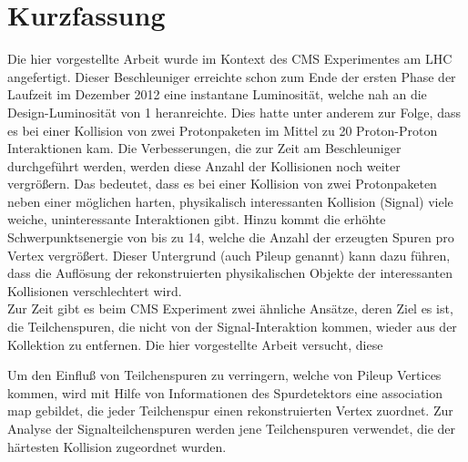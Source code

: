 
\chapter*{Kurzfassung}

Die hier vorgestellte Arbeit wurde im Kontext des CMS Experimentes am LHC angefertigt. Dieser Beschleuniger erreichte schon zum Ende der ersten Phase der Laufzeit im Dezember 2012 eine instantane Luminosit\"a{}t, welche nah an die Design-Luminosit\"a{}t von 1\percms{} heranreichte. Dies hatte unter anderem zur Folge, dass es bei einer Kollision von zwei Protonpaketen im Mittel zu 20 Proton-Proton Interaktionen kam. Die Verbesserungen, die zur Zeit am Beschleuniger durchgef\"u{}hrt werden, werden diese Anzahl der Kollisionen noch weiter vergr\"o{}\ss{}ern. Das bedeutet, dass es bei einer Kollision von zwei Protonpaketen neben einer m\"o{}glichen harten, physikalisch interessanten Kollision (Signal) viele weiche, uninteressante Interaktionen gibt. Hinzu kommt die erh\"o{}hte Schwerpunktsenergie von bis zu 14\TeV{}, welche die Anzahl der erzeugten Spuren pro Vertex vergr\"o{}\ss{}ert. Dieser Untergrund (auch Pileup genannt) kann dazu f\"u{}hren, dass die Aufl\"o{}sung der rekonstruierten physikalischen Objekte der interessanten Kollisionen verschlechtert wird. \\
Zur Zeit gibt es beim CMS Experiment zwei \"a{}hnliche Ans\"a{}tze, deren Ziel es ist, die Teilchenspuren, die nicht von der Signal-Interaktion kommen, wieder aus der Kollektion zu entfernen. Die hier vorgestellte Arbeit versucht, diese




Um den Einflu\ss{} von Teilchenspuren zu verringern, welche von Pileup Vertices kommen, wird mit Hilfe von Informationen des Spurdetektors eine association map gebildet, die jeder Teilchenspur einen rekonstruierten Vertex zuordnet. Zur Analyse der Signalteilchenspuren werden jene Teilchenspuren verwendet, die der h\"a{}rtesten Kollision zugeordnet wurden.



